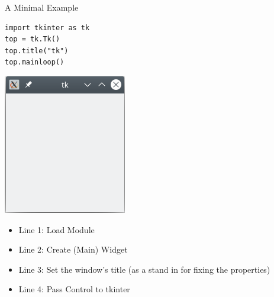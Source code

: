 \begin{frame}[fragile]{A Minimal Example}
%
\begin{tcbraster}[raster columns=2,
                  raster equal height,
                  nobeforeafter,
                  raster column skip=0.5cm]
\begin{codebox}
\begin{verbatim}
import tkinter as tk
top = tk.Tk()
top.title("tk")
top.mainloop()
\end{verbatim}
\end{codebox}
%
\begin{tcolorbox}[title=Output: Window with tkInter]
\centering
\includegraphics[width=.3\linewidth]{./gfx/tk-mini}
\end{tcolorbox}
\end{tcbraster}
%
\begin{itemize}
\item Line 1: Load Module
\item Line 2: Create (Main) Widget
\item Line 3: Set the window's title (as a stand in for fixing the properties)
\item Line 4: Pass Control to tkinter
\end{itemize}
%
\end{frame}


